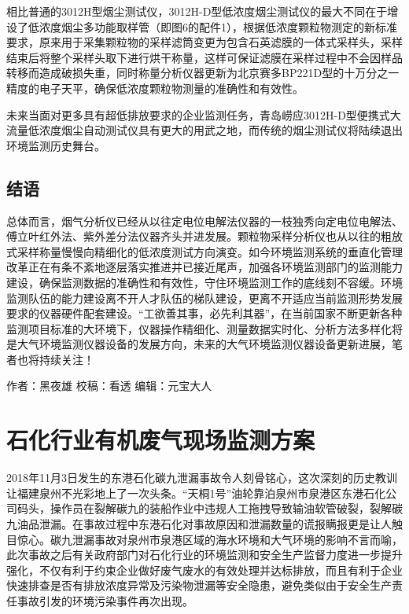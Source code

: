 \documentclass[]{book}
\begin{document}
相比普通的3012H型烟尘测试仪，3012H-D型低浓度烟尘测试仪的最大不同在于增设了低浓度烟尘多功能取样管（即图6的配件1），根据低浓度颗粒物测定的新标准要求，原来用于采集颗粒物的采样滤筒变更为包含石英滤膜的一体式采样头，采样结束后将整个采样头取下进行烘干称量，这样可保证滤膜在采样过程中不会因样品转移而造成破损失重，同时称量分析仪器更新为北京赛多BP221D型的十万分之一精度的电子天平，确保低浓度颗粒物测量的准确性和有效性。

未来当面对更多具有超低排放要求的企业监测任务，青岛崂应3012H-D型便携式大流量低浓度烟尘自动测试仪具有更大的用武之地，而传统的烟尘测试仪将陆续退出环境监测历史舞台。

\hypertarget{ux7ed3ux8bed-7}{%
\subsection{结语}\label{ux7ed3ux8bed-7}}

总体而言，烟气分析仪已经从以往定电位电解法仪器的一枝独秀向定电位电解法、傅立叶红外法、紫外差分法仪器齐头并进发展。颗粒物采样分析仪也从以往的粗放式采样称量慢慢向精细化的低浓度测试方向演变。如今环境监测系统的垂直化管理改革正在有条不紊地逐层落实推进并已接近尾声，加强各环境监测部门的监测能力建设，确保监测数据的准确性和有效性，守住环境监测工作的底线刻不容缓。环境监测队伍的能力建设离不开人才队伍的梯队建设，更离不开适应当前监测形势发展要求的仪器硬件配套建设。``工欲善其事，必先利其器''，在当前国家不断更新各种监测项目标准的大环境下，仪器操作精细化、测量数据实时化、分析方法多样化将是大气环境监测仪器设备的发展方向，未来的大气环境监测仪器设备更新进展，笔者也将持续关注！

作者：黑夜雄
校稿：看透
编辑：元宝大人

\hypertarget{ux77f3ux5316ux884cux4e1aux6709ux673aux5e9fux6c14ux73b0ux573aux76d1ux6d4bux65b9ux6848}{%
\section{石化行业有机废气现场监测方案}\label{ux77f3ux5316ux884cux4e1aux6709ux673aux5e9fux6c14ux73b0ux573aux76d1ux6d4bux65b9ux6848}}

2018年11月3日发生的东港石化碳九泄漏事故令人刻骨铭心，这次深刻的历史教训让福建泉州不光彩地上了一次头条。``天桐1号''油轮靠泊泉州市泉港区东港石化公司码头，操作员在裂解碳九的装船作业中违规人工拖拽导致输油软管破裂，裂解碳九油品泄漏。在事故过程中东港石化对事故原因和泄漏数量的谎报瞒报更是让人触目惊心。碳九泄漏事故对泉州市泉港区域的海水环境和大气环境的影响不言而喻，此次事故之后有关政府部门对石化行业的环境监测和安全生产监督力度进一步提升强化，不仅有利于约束企业做好废气废水的有效处理并达标排放，而且有利于企业快速排查是否有排放浓度异常及污染物泄漏等安全隐患，避免类似由于安全生产责任事故引发的环境污染事件再次出现。
\end{document}
